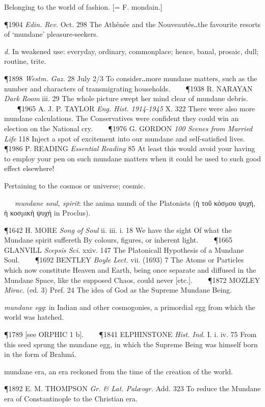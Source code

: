 \begin{description}[wide, labelwidth=!, labelindent=0pt]
\begin{myenumerate}
 Belonging to the world of fashion. [= F. mondain.]

\P 1904  \textit{Edin. Rev.} Oct. 298 The Athénée and the Nouveautés‥the favourite resorts of ‘mundane’ pleasure-seekers.

\textit{d.} In weakened use: everyday, ordinary, commonplace; hence, banal, prosaic, dull; routine, trite.

\P 1898  \textit{Westm. Gaz.} 28 July 2/3 To consider‥more mundane matters, such as the number and characters of transmigrating households.    
\P 1938 R. NARAYAN  \textit{Dark Room} iii. 29 The whole picture swept her mind clear of mundane debris.    
\P 1965 A. J. P. TAYLOR  \textit{Eng. Hist. 1914-1945} X. 322  There were also more mundane calculations. The Conservatives were confident they could win an election on the National cry.    
\P 1976 G. GORDON  \textit{100 Scenes from Married Life} 118 Inject a spot of excitement into our mundane and self-satisfied lives.    
\P 1986 P. READING  \textit{Essential Reading} 85 At least this would avoid your having to employ your pen on such mundane matters when it could be used to such good effect elsewhere!

 Pertaining to the cosmos or universe; cosmic.

   \textit{mundane soul, spirit}: the anima mundi of the Platonists (ἡ τοῦ κόσµου ψυχή, ἡ κοσµικὴ ψυχή in Proclus).

\P 1642 H. MORE  \textit{Song of Soul} ii. iii. i. 18 We have the sight Of what the Mundane spirit suffereth By colours, figures, or inherent light.    
\P 1665 GLANVILL  \textit{Scepsis Sci.} xxiv. 147 The Platonicall Hypothesis of a Mundane Soul.    
\P 1692 BENTLEY  \textit{Boyle Lect.} vii. (1693) 7 The Atoms or Particles which now constitute Heaven and Earth, being once separate and diffused in the Mundane Space, like the supposed Chaos, could never [etc.].    
\P 1872 MOZLEY  \textit{Mirac.} (ed. 3) Pref. 24 The idea of God as the Supreme Mundane Being.

 \textit{mundane egg}: in Indian and other cosmogonies, a primordial egg from which the world was hatched.

\P 1789 [see ORPHIC 1 b].    
\P 1841 ELPHINSTONE  \textit{Hist. Ind.} I. i. iv. 75 From this seed sprung the mundane egg, in which the Supreme Being was himself born in the form of Brahmá.

 mundane era, an era reckoned from the time of the creation of the world.

\P 1892 E. M. THOMPSON  \textit{Gr. \& Lat. Palæogr.} Add. 323 To reduce the Mundane era of Constantinople to the Christian era.


\end{myenumerate}
\end{description}
